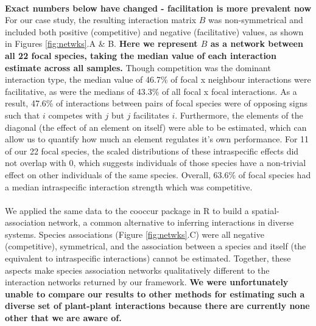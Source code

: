 \documentclass[a4,12pt]{article}
\begin{document}


    \paragraph{}
    \textbf{Exact numbers below have changed - facilitation is more prevalent now}
     For our case study, the resulting interaction matrix $B$ was non-symmetrical and included both positive (competitive) and negative (facilitative) values, as shown in Figures \ref{fig:netwks}.A \& B. \textbf{Here we represent $B$ as a network between all 22 focal species, taking the median value of each interaction estimate across all samples.} Though competition was the dominant interaction type,  the median value of 46.7\% of focal x neighbour interactions were facilitative, as were the medians of 43.3\% of all focal x focal interactions. As a result, 47.6\% of interactions between pairs of focal species were of opposing signs such that $i$ competes with $j$ but $j$ facilitates $i$. Furthermore, the elements of the diagonal (the effect of an element on itself) were able to be estimated, which can allow us to quantify how much an element regulates it's own performance. For 11 of our 22 focal species, the scaled distributions of these intraspecific effects did not overlap with 0, which suggests individuals of those species have a non-trivial effect on other individuals of the same species. Overall, 63.6\% of focal species had a median intraspecific interaction strength which was competitive. 


     \paragraph{}
     We applied the same data to the cooccur package in R \parencite{Griffith2016} to build a spatial-association network, a common alternative to inferring interactions in diverse systems. Species associations (Figure \ref{fig:netwks}.C) were all negative (competitive), symmetrical, and the association between a species and itself (the equivalent to intraspecific interactions) cannot be estimated. Together, these aspects make species association networks qualitatively different to the interaction networks returned by our framework. \textbf{We were unfortunately unable to compare our results to other methods for estimating such a diverse set of plant-plant interactions because there are currently none other that we are aware of.}
\end{document}
